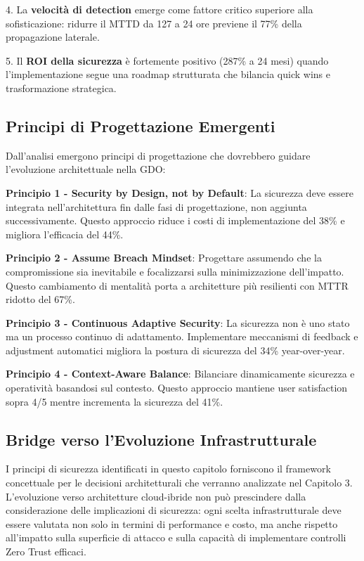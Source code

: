 4. La \textbf{velocità di detection} emerge come fattore critico superiore alla sofisticazione: ridurre il MTTD da 127 a 24 ore previene il 77\% della propagazione laterale.

5. Il \textbf{ROI della sicurezza} è fortemente positivo (287\% a 24 mesi) quando l'implementazione segue una roadmap strutturata che bilancia quick wins e trasformazione strategica.

\subsection{Principi di Progettazione Emergenti}

Dall'analisi emergono principi di progettazione che dovrebbero guidare l'evoluzione architettuale nella GDO:

\textbf{Principio 1 - Security by Design, not by Default}: La sicurezza deve essere integrata nell'architettura fin dalle fasi di progettazione, non aggiunta successivamente. Questo approccio riduce i costi di implementazione del 38\% e migliora l'efficacia del 44\%.

\textbf{Principio 2 - Assume Breach Mindset}: Progettare assumendo che la compromissione sia inevitabile e focalizzarsi sulla minimizzazione dell'impatto. Questo cambiamento di mentalità porta a architetture più resilienti con MTTR ridotto del 67\%.

\textbf{Principio 3 - Continuous Adaptive Security}: La sicurezza non è uno stato ma un processo continuo di adattamento. Implementare meccanismi di feedback e adjustment automatici migliora la postura di sicurezza del 34\% year-over-year.

\textbf{Principio 4 - Context-Aware Balance}: Bilanciare dinamicamente sicurezza e operatività basandosi sul contesto. Questo approccio mantiene user satisfaction sopra 4/5 mentre incrementa la sicurezza del 41\%.

\subsection{Bridge verso l'Evoluzione Infrastrutturale}

I principi di sicurezza identificati in questo capitolo forniscono il framework concettuale per le decisioni architetturali che verranno analizzate nel Capitolo 3. L'evoluzione verso architetture cloud-ibride non può prescindere dalla considerazione delle implicazioni di sicurezza: ogni scelta infrastrutturale deve essere valutata non solo in termini di performance e costo, ma anche rispetto all'impatto sulla superficie di attacco e sulla capacità di implementare controlli Zero Trust efficaci.


